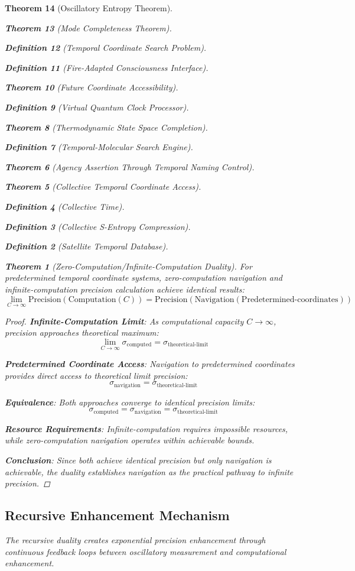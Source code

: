 \documentclass[12pt,a4paper]{article}
\newtheorem{theorem}{Theorem}[section]
\newtheorem{definition}[theorem]{Definition}
\begin{document}
\begin{theorem}[Oscillatory Entropy Theorem]
\begin{theorem}[Mode Completeness Theorem]
\begin{enumerate}
\begin{definition}[Temporal Coordinate Search Problem]
\begin{algorithm}
\begin{definition}[Fire-Adapted Consciousness Interface]
\begin{theorem}[Future Coordinate Accessibility]
\begin{definition}[Virtual Quantum Clock Processor]
\begin{itemize}
\begin{itemize}
\begin{theorem}[Thermodynamic State Space Completion]
\begin{definition}[Temporal-Molecular Search Engine]
\begin{theorem}[Agency Assertion Through Temporal Naming Control]
\begin{remark}
\begin{theorem}[Collective Temporal Coordinate Access]
\begin{definition}[Collective Time]
\begin{definition}[Collective S-Entropy Compression]
\begin{definition}[Satellite Temporal Database]
\begin{algorithm}
\begin{table}[h]
{\begin{theorem}[Zero-Computation/Infinite-Computation Duality]
For predetermined temporal coordinate systems, zero-computation navigation and infinite-computation precision calculation achieve identical results:
$$\lim_{C \to \infty} \text{Precision}(\text{Computation}(C)) = \text{Precision}(\text{Navigation}(\text{Predetermined-coordinates}))$$
\end{theorem}

\begin{proof}
\textbf{Infinite-Computation Limit}: As computational capacity $C \to \infty$, precision approaches theoretical maximum:
$$\lim_{C \to \infty} \sigma_{\text{computed}} = \sigma_{\text{theoretical-limit}}$$

\textbf{Predetermined Coordinate Access}: Navigation to predetermined coordinates provides direct access to theoretical limit precision:
$$\sigma_{\text{navigation}} = \sigma_{\text{theoretical-limit}}$$

\textbf{Equivalence}: Both approaches converge to identical precision limits:
$$\sigma_{\text{computed}} = \sigma_{\text{navigation}} = \sigma_{\text{theoretical-limit}}$$

\textbf{Resource Requirements}: Infinite-computation requires impossible resources, while zero-computation navigation operates within achievable bounds.

\textbf{Conclusion}: Since both achieve identical precision but only navigation is achievable, the duality establishes navigation as the practical pathway to infinite precision.
\end{proof}

\subsection{Recursive Enhancement Mechanism}

The recursive duality creates exponential precision enhancement through continuous feedback loops between oscillatory measurement and computational enhancement.

}
\end{table}
\end{algorithm}
\end{definition}
\end{definition}
\end{definition}
\end{theorem}
\end{remark}
\end{theorem}
\end{definition}
\end{theorem}
\end{itemize}
\end{itemize}
\end{definition}
\end{theorem}
\end{definition}
\end{algorithm}
\end{definition}
\end{enumerate}
\end{theorem}
\end{theorem}
\end{document}
